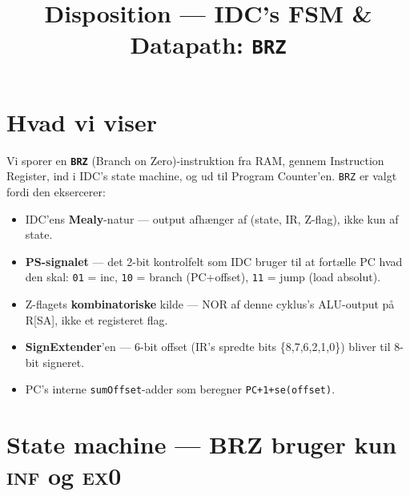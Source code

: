 \documentclass[11pt,a4paper]{article}
\title{\vspace{-1em}\textcolor{accent}{\Large Disposition --- IDC's FSM \& Datapath: \texttt{BRZ}}}
\author{}
\date{}
\begin{document}
\maketitle
\vspace{-3em}

\section*{Hvad vi viser}

Vi sporer en \textbf{\texttt{BRZ}} (Branch on Zero)-instruktion
fra RAM, gennem Instruction Register, ind i IDC's state machine,
og ud til Program Counter'en. \texttt{BRZ} er valgt fordi den eksercerer:

\begin{itemize}
  \item IDC'ens \textbf{Mealy}-natur --- output afhænger af (state, IR, Z-flag), ikke kun af state.
  \item \textbf{PS-signalet} --- det 2-bit kontrolfelt som IDC bruger til at fortælle PC hvad den skal:
        \texttt{01} = inc, \texttt{10} = branch (PC+offset), \texttt{11} = jump (load absolut).
  \item Z-flagets \textbf{kombinatoriske} kilde --- NOR af denne cyklus's ALU-output på R[SA], ikke et registeret flag.
  \item \textbf{SignExtender}'en --- 6-bit offset (IR's spredte bits \{8,7,6,2,1,0\}) bliver til 8-bit signeret.
  \item PC's interne \texttt{sumOffset}-adder som beregner \texttt{PC+1+se(offset)}.
\end{itemize}

\section*{State machine --- BRZ bruger kun \textsc{inf} og \textsc{ex0}}

\begin{center}
\end{center}
\end{document}

